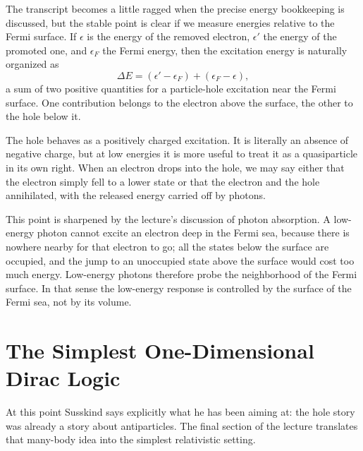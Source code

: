 The transcript becomes a little ragged when the precise energy bookkeeping is discussed, but the stable point is clear if we measure energies relative to the Fermi surface. If \(\epsilon\) is the energy of the removed electron, \(\epsilon'\) the energy of the promoted one, and \(\epsilon_F\) the Fermi energy, then the excitation energy is naturally organized as
\begin{equation}
\Delta E
=
(\epsilon'-\epsilon_F)+(\epsilon_F-\epsilon),
\end{equation}
a sum of two positive quantities for a particle-hole excitation near the Fermi surface. One contribution belongs to the electron above the surface, the other to the hole below it.

The hole behaves as a positively charged excitation. It is literally an absence of negative charge, but at low energies it is more useful to treat it as a quasiparticle in its own right. When an electron drops into the hole, we may say either that the electron simply fell to a lower state or that the electron and the hole annihilated, with the released energy carried off by photons.

This point is sharpened by the lecture's discussion of photon absorption. A low-energy photon cannot excite an electron deep in the Fermi sea, because there is nowhere nearby for that electron to go; all the states below the surface are occupied, and the jump to an unoccupied state above the surface would cost too much energy. Low-energy photons therefore probe the neighborhood of the Fermi surface. In that sense the low-energy response is controlled by the surface of the Fermi sea, not by its volume.

\section{The Simplest One-Dimensional Dirac Logic}

At this point Susskind says explicitly what he has been aiming at: the hole story was already a story about antiparticles. The final section of the lecture translates that many-body idea into the simplest relativistic setting.

